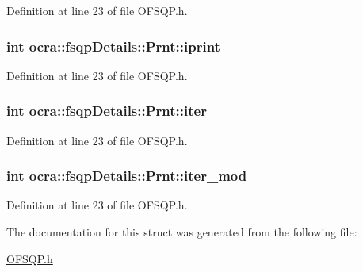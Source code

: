 Definition at line 23 of file O\+F\+S\+Q\+P.\+h.

\subsubsection[{\texorpdfstring{iprint}{iprint}}]{\setlength{\rightskip}{0pt plus 5cm}int ocra\+::fsqp\+Details\+::\+Prnt\+::iprint}\hypertarget{structocra_1_1fsqpDetails_1_1Prnt_a6ae9ecd70d6b52123a4d24a8cc47dfa6}{}\label{structocra_1_1fsqpDetails_1_1Prnt_a6ae9ecd70d6b52123a4d24a8cc47dfa6}


Definition at line 23 of file O\+F\+S\+Q\+P.\+h.

\subsubsection[{\texorpdfstring{iter}{iter}}]{\setlength{\rightskip}{0pt plus 5cm}int ocra\+::fsqp\+Details\+::\+Prnt\+::iter}\hypertarget{structocra_1_1fsqpDetails_1_1Prnt_a276fb8038114797a04a94e1b2ec10a35}{}\label{structocra_1_1fsqpDetails_1_1Prnt_a276fb8038114797a04a94e1b2ec10a35}


Definition at line 23 of file O\+F\+S\+Q\+P.\+h.

\subsubsection[{\texorpdfstring{iter\+\_\+mod}{iter_mod}}]{\setlength{\rightskip}{0pt plus 5cm}int ocra\+::fsqp\+Details\+::\+Prnt\+::iter\+\_\+mod}\hypertarget{structocra_1_1fsqpDetails_1_1Prnt_ab7a06548e1ccc8483b3221798ab15e7e}{}\label{structocra_1_1fsqpDetails_1_1Prnt_ab7a06548e1ccc8483b3221798ab15e7e}


Definition at line 23 of file O\+F\+S\+Q\+P.\+h.



The documentation for this struct was generated from the following file\+:\begin{DoxyCompactItemize}
\item 
\hyperlink{OFSQP_8h}{O\+F\+S\+Q\+P.\+h}\end{DoxyCompactItemize}
